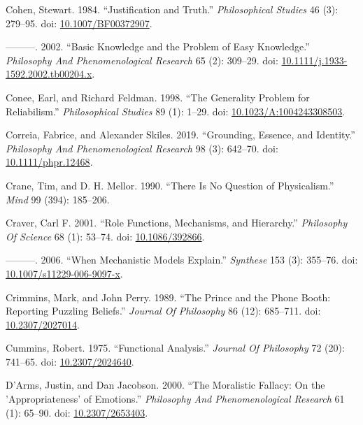 \documentclass[
  10pt,
  letterpaper,
  DIV=11,
  numbers=noendperiod,
  twoside]{scrartcl}
\newlength{\cslhangindent}
\newenvironment{CSLReferences}[2] %
 {\begin{list}{}{%
  \setlength{\itemindent}{0pt}
  \setlength{\leftmargin}{0pt}
  \setlength{\parsep}{0pt}
  \ifodd #1
   \setlength{\leftmargin}{\cslhangindent}
   \setlength{\itemindent}{-1\cslhangindent}
  \fi
  \setlength{\itemsep}{#2\baselineskip}}}
 {\end{list}}
\begin{document}
\begin{CSLReferences}{1}{0}
Cohen, Stewart. 1984. {``Justification and Truth.''} \emph{Philosophical
Studies} 46 (3): 279--95. doi:
\href{https://doi.org/10.1007/BF00372907}{10.1007/BF00372907}.

---------. 2002. {``Basic Knowledge and the Problem of Easy
Knowledge.''} \emph{Philosophy And Phenomenological Research} 65 (2):
309--29. doi:
\href{https://doi.org/10.1111/j.1933-1592.2002.tb00204.x}{10.1111/j.1933-1592.2002.tb00204.x}.

Conee, Earl, and Richard Feldman. 1998. {``The Generality Problem for
Reliabilism.''} \emph{Philosophical Studies} 89 (1): 1--29. doi:
\href{https://doi.org/10.1023/A:1004243308503}{10.1023/A:1004243308503}.

Correia, Fabrice, and Alexander Skiles. 2019. {``Grounding, Essence, and
Identity.''} \emph{Philosophy And Phenomenological Research} 98 (3):
642--70. doi:
\href{https://doi.org/10.1111/phpr.12468}{10.1111/phpr.12468}.

Crane, Tim, and D. H. Mellor. 1990. {``There Is No Question of
Physicalism.''} \emph{Mind} 99 (394): 185--206.

Craver, Carl F. 2001. {``Role Functions, Mechanisms, and Hierarchy.''}
\emph{Philosophy Of Science} 68 (1): 53--74. doi:
\href{https://doi.org/10.1086/392866}{10.1086/392866}.

---------. 2006. {``When Mechanistic Models Explain.''} \emph{Synthese}
153 (3): 355--76. doi:
\href{https://doi.org/10.1007/s11229-006-9097-x}{10.1007/s11229-006-9097-x}.

Crimmins, Mark, and John Perry. 1989. {``The Prince and the Phone Booth:
Reporting Puzzling Beliefs.''} \emph{Journal Of Philosophy} 86 (12):
685--711. doi: \href{https://doi.org/10.2307/2027014}{10.2307/2027014}.

Cummins, Robert. 1975. {``Functional Analysis.''} \emph{Journal Of
Philosophy} 72 (20): 741--65. doi:
\href{https://doi.org/10.2307/2024640}{10.2307/2024640}.

D'Arms, Justin, and Dan Jacobson. 2000. {``The Moralistic Fallacy: On
the 'Appropriateness' of Emotions.''} \emph{Philosophy And
Phenomenological Research} 61 (1): 65--90. doi:
\href{https://doi.org/10.2307/2653403}{10.2307/2653403}.


\end{CSLReferences}
\end{document}
